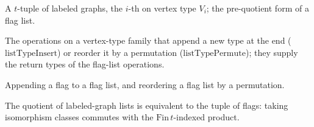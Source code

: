 \begin{definition}
  \label{def:labeled-graph-list}
  \leanok
  A $t$-tuple of labeled graphs, the $i$-th on vertex type $V_i$; the
  pre-quotient form of a flag list.
\end{definition}

\begin{definition}
  \label{def:list-type-ops}
  \leanok
  The operations on a vertex-type family that append a new type at the end
  ($\mathrm{listTypeInsert}$) or reorder it by a permutation
  ($\mathrm{listTypePermute}$); they supply the return types of the flag-list
  operations.
\end{definition}

\begin{definition}
  \label{def:flag-list-ops}
  \leanok
  Appending a flag to a flag list, and reordering a flag list by a permutation.
\end{definition}

\begin{theorem}
  \label{thm:eqv-quot-list-flaglist}
  \leanok
  The quotient of labeled-graph lists is equivalent to the tuple of flags: taking
  isomorphism classes commutes with the $\mathrm{Fin}\,t$-indexed product.
\end{theorem}
